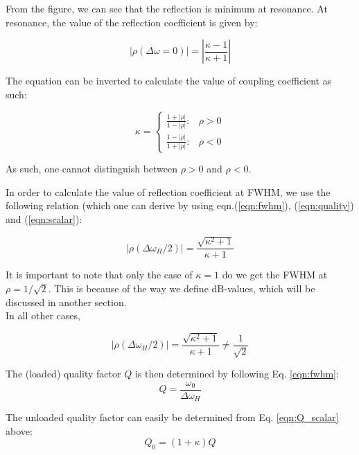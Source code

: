 \documentclass[a4paper]{article}
\numberwithin{equation}{section}
\begin{document}
From the figure, we can see that the reflection is minimum at resonance. At resonance, the value of the reflection coefficient is given by:

\begin{equation}
		\left| \rho (\Delta \omega = 0) \right| = \left| \frac{\kappa - 1}{\kappa +1} \right| 
\end{equation}

The equation can be inverted to calculate the value of coupling coefficient as
such:

\begin{equation}
	\kappa = 
	\begin{cases}
		\frac{1 + |\rho|}{1 - |\rho|} :& \rho > 0\\
		\frac{1 - |\rho|}{1 + |\rho|} :& \rho < 0
	\end{cases}
	\label{eqn:kappa_rho}
\end{equation}

As such, one cannot distinguish between $\rho >0$ and $\rho<0$. 

In order to calculate the value of reflection coefficient at FWHM, we use the following relation (which one can derive by using eqn.(\ref{eqn:fwhm}), (\ref{eqn:quality}) and (\ref{eqn:scalar}):

\begin{equation}
		\left| \rho (\Delta \omega_{H}/2) \right| = \frac{\sqrt{\kappa^2 + 1} }{\kappa +1} 
		\label{eqn:rho_fwhm}
\end{equation}

It is important to note that only the case of $\kappa = 1$ do we get the FWHM at $\rho = 1 / \sqrt{2} $. This is because of the way we define dB-values, which will be discussed in another section. \\
In all other cases, 

\[
		\left| \rho (\Delta \omega_{H}/2) \right| = \frac{\sqrt{\kappa^2 + 1} }{\kappa +1} \ne \frac{1}{\sqrt{2} } 
\]

The (loaded) quality factor $Q$ is then determined by following Eq.
\ref{eqn:fwhm}:
\begin{equation}
	Q = \frac{\omega_0}{\Delta\omega_H}
	\label{eqn:Q_scalar}
\end{equation}

The unloaded quality factor can easily be determined from Eq. \ref{eqn:Q_scalar}
above:
\begin{equation}
	Q_0 = (1 + \kappa)Q
	\label{eqn:Q0_scalar}
\end{equation}
\end{document}
